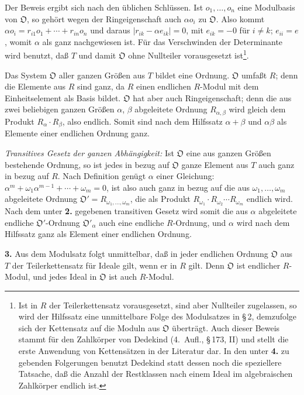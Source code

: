 \documentclass[12pt,a4paper]{article}
\newcommand{\fO}{\mathfrak{O}}
\theoremstyle{plain}
\theoremstyle{definition}
\theoremstyle{remark}
\begin{document}
Der Beweis ergibt sich nach den üblichen Schlüssen. Ist $o_{1},\dots,o_{n}$ eine Modulbasis von $\fO$, so gehört wegen der Ringeigenschaft auch $\alpha o_{i}$ zu $\fO$. Also kommt $\alpha o_{i} = r_{i1}o_{1} + \cdots + r_{in}o_{n}$ und daraus $|r_{ik} - \alpha e_{ik}| = 0$, mit $e_{ik} = -0$ für $i \neq k$; $e_{ii} = e$, womit $\alpha$ als ganz nachgewiesen ist. Für das Verschwinden der Determinante wird benutzt, daß $T$ und damit $\fO$ ohne Nullteiler vorausgesetzt ist\footnote{Ist in $R$ der Teilerkettensatz vorausgesetzt, sind aber Nullteiler zugelassen, so wird der Hilfssatz eine unmittelbare Folge des Modulsatzes in \S\,2, demzufolge sich der Kettensatz auf die Moduln aus $\fO$ überträgt. Auch dieser Beweis stammt für den Zahlkörper von Dedekind (4.~Aufl., \S\,173, II) und stellt die erste Anwendung von Kettensätzen in der Literatur dar. In den unter \textbf{4.} zu gebenden Folgerungen benutzt Dedekind statt dessen noch die speziellere Tatsache, daß die Anzahl der Restklassen nach einem Ideal im algebraischen Zahlkörper endlich ist.}.

Das System $\fO$ aller ganzen Größen aus $T$ bildet eine Ordnung. $\fO$ umfaßt $R$; denn die Elemente aus $R$ sind ganz, da $R$ einen endlichen $R$-Modul mit dem Einheitselement als Basis bildet. $\fO$ hat aber auch Ringeigenschaft; denn die aus zwei beliebigen ganzen Größen $\alpha$, $\beta$ abgeleitete Ordnung $R_{\alpha,\beta}$ wird gleich dem Produkt $R_{\alpha} \cdot R_{\beta}$, also endlich. Somit sind nach dem Hilfssatz $\alpha + \beta$ und $\alpha\beta$ als Elemente einer endlichen Ordnung ganz.

\textit{Transitives Gesetz der ganzen Abhängigkeit:} Ist $\fO$ eine aus ganzen Größen bestehende Ordnung, so ist jedes in bezug auf $\fO$ ganze Element aus $T$ auch ganz in bezug auf $R$. Nach Definition genügt $\alpha$ einer Gleichung: $\alpha^{m} + \omega_{1}\alpha^{m-1} + \cdots + \omega_{m} = 0$, ist also auch ganz in bezug auf die aus $\omega_{1},\dots,\omega_{m}$ abgeleitete Ordnung $\fO' = R_{\omega_{1},\dots,\omega_{m}}$, die als Produkt $R_{\omega_{1}} \cdot R_{\omega_{2}} \cdots R_{\omega_{m}}$ endlich wird. Nach dem unter \textbf{2.} gegebenen transitiven Gesetz wird somit die aus $\alpha$ abgeleitete endliche $\fO'$-Ordnung $\fO'_{\alpha}$ auch eine endliche $R$-Ordnung, und $\alpha$ wird nach dem Hilfssatz ganz als Element einer endlichen Ordnung.

\medskip
\noindent
\textbf{3.} Aus dem Modulsatz folgt unmittelbar, daß in jeder endlichen Ordnung $\fO$ aus $T$ der Teilerkettensatz für Ideale gilt, wenn er in $R$ gilt. Denn $\fO$ ist endlicher $R$-Modul, und jedes Ideal in $\fO$ ist auch $R$-Modul.
\end{document}
